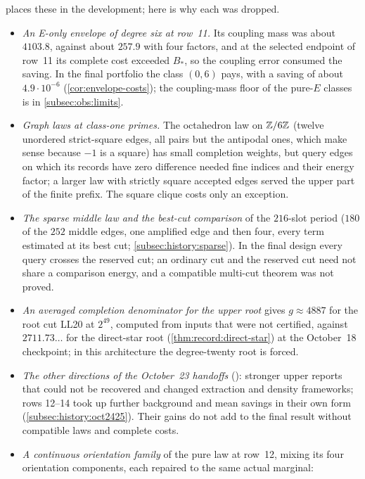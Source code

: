  places these in the development; here is why each was
dropped.
\begin{itemize}
\item \emph{An E-only envelope of degree six at row~11.} Its coupling mass was
 about $4103.8$, against about $257.9$ with four factors, and at the selected
 endpoint of row~11 its complete cost exceeded $B_*$, so the coupling error
 consumed the saving. In the final portfolio the class $(0,6)$ pays, with a
 saving of about $4.9\cdot10^{-6}$ (\cref{cor:envelope-costs}); the coupling-mass
 floor of the pure-$E$ classes is in \cref{subsec:obs:limits}.
\item \emph{Graph laws at class-one primes.} The octahedron law on $\mathbb Z/6\mathbb Z$
 (twelve unordered strict-square edges, all pairs but the antipodal ones, which
 make sense because $-1$ is a square) has small completion weights, but query
 edges on which its records have zero difference needed fine indices and their
 energy factor; a larger law with strictly square accepted edges served the upper
 part of the finite prefix. The square clique costs only an exception.
\item \emph{The sparse middle law and the best-cut comparison} of the
 $216$-slot period ($180$ of the $252$ middle edges, one amplified edge and then
 four, every term estimated at its best cut; \cref{subsec:history:sparse}). In
 the final design every query
 crosses the reserved cut; an ordinary cut and the reserved cut need not share a
 comparison energy, and a compatible multi-cut theorem was not proved.
\item \emph{An averaged completion denominator for the upper root} gives $g\approx4887$ for the root cut LL20 at $2^{49}$, computed from inputs that were not certified, against $2711.73\ldots$ for the direct-star root
 (\cref{thm:record:direct-star}) at the October~18 checkpoint; in this
 architecture the degree-twenty root is forced.
\item \emph{The other directions of the October~23 handoffs}
 (): stronger upper reports that could
 not be recovered and changed extraction and density frameworks; rows 12--14
 took up further background and mean savings in their own form
 (\cref{subsec:history:oct2425}). Their gains do not add to the final result
 without compatible laws and complete costs.
\item \emph{A continuous orientation family} of the pure law at row~12, mixing
 its four orientation components, each repaired to the same actual marginal:

\end{itemize}
